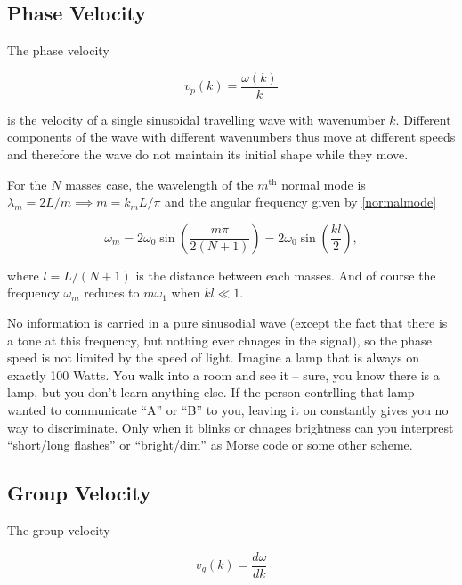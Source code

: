 \documentclass[a4paper,12pt]{report}
\begin{document}
\subsection{Phase Velocity}

The phase velocity 

\begin{equation}
	v_{p}(k) = \frac{\omega (k)}{k}  
\end{equation}

is the velocity of a single sinusoidal travelling wave with wavenumber \(k\). Different components of the wave with different wavenumbers thus move at different speeds and therefore the wave do not maintain its initial shape while they move.

For the \(N\) masses case, the wavelength of the \(m^{\text{th}} \) normal mode is \(\lambda _{m} = 2L /m \implies m = k_{m}L /\pi  \) and the angular frequency given by \cref{normalmode}

\begin{equation}
	\omega _{m} = 2 \omega _{0} \sin \left( \frac{m\pi }{2(N+1)}  \right) =  2 \omega _{0}\sin \left( \frac{kl}{2}  \right),
\end{equation}

where \(l = L /(N+1)\) is the distance between each masses. And of course the frequency \(\omega _{m} \) reduces to \(m \omega _{1} \) when \(kl \ll  1\).    

No information is carried in a pure sinusodial wave (except the fact that there is a tone at this frequency, but nothing ever chnages in the signal), so the phase speed is not limited by the speed of light. Imagine a lamp that is always on exactly 100 Watts. You walk into a room and see it -- sure, you know there is a lamp, but you don't learn anything else. If the person contrlling that lamp wanted to communicate ``A'' or ``B'' to you, leaving it on constantly gives you no way to discriminate. Only when it blinks or chnages brightness can you interprest ``short/long flashes'' or ``bright/dim'' as Morse code or some other scheme.

\subsection{Group Velocity}

The group velocity 

\begin{equation}
	v_{g}(k) = \frac{d \omega }{dk}  
\end{equation}
\end{document}
